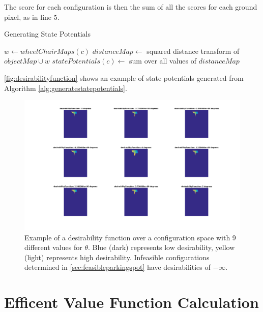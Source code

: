 The score for each configuration is then the sum of all the scores for each
ground pixel, as in line 5.

\begin{algorithm}
\caption{Generating State Potentials}
\label{alg:generatestatepotentials}
\begin{algorithmic}[1]
\Statex
{}
        \State $w \gets wheelChairMaps(c)$
        \State $distanceMap \gets$ squared distance transform of $objectMap \cup w$
        \State $statePotentials(c) \gets$ sum over all values of $distanceMap$
    \EndFor
\EndFunction
\Statex
{}
\end{algorithmic}
\end{algorithm}

\autoref{fig:desirabilityfunction} shows an example of state potentials
generated from Algorithm \autoref{alg:generatestatepotentials}.

\begin{figure}
\centering
\includegraphics[width=6in]{figures/desirabilityfunction.png}
\caption{Example of a desirability function over a configuration space with 9
different values for $\theta$. Blue (dark) represents low desirability, yellow
(light) represents high desirability. Infeasible configurations determined in 
\autoref{sec:feasibleparkingspot} have desirabilities of $-\infty$.} 
\label{fig:desirabilityfunction}
\end{figure}

\section{Efficent Value Function Calculation}
